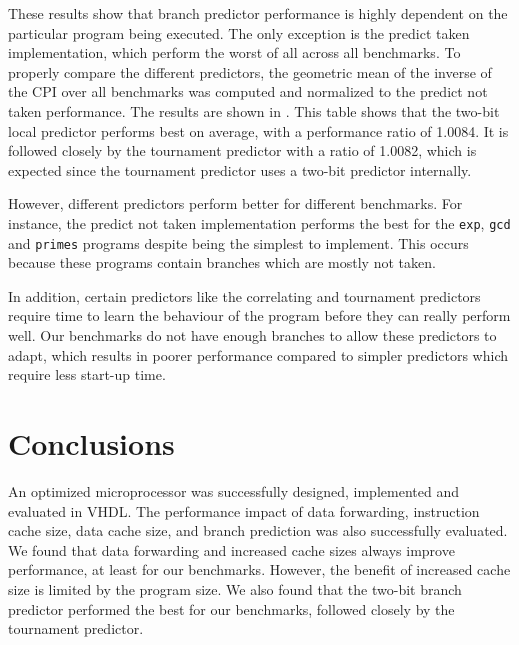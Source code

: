 \documentclass[conference,hidelinks]{IEEEtran}
\begin{document}
These results show that branch predictor performance is highly dependent on the particular program being executed. The only exception is the predict taken implementation, which perform the worst of all across all benchmarks. To properly compare the different predictors, the geometric mean of the inverse of the CPI over all benchmarks was computed and normalized to the predict not taken performance. The results \newpage \noindent are shown in . This table shows that the two-bit local predictor performs best on average, with a performance ratio of 1.0084. It is followed closely by the tournament predictor with a ratio of 1.0082, which is expected since the tournament predictor uses a two-bit predictor internally.

\begin{table}[!htb]
\small
\centering
\caption{Relative performance of different branch predictors.}
\label{tab:bp_performance}
\end{table}

However, different predictors perform better for different benchmarks. For instance, the predict not taken implementation performs the best for the \texttt{exp}, \texttt{gcd} and \texttt{primes} programs despite being the simplest to implement. This occurs because these programs contain branches which are mostly not taken.

In addition, certain predictors like the correlating and tournament predictors require time to learn the behaviour of the program before they can really perform well. Our benchmarks do not have enough branches to allow these predictors to adapt, which results in poorer performance compared to simpler predictors which require less start-up time.

\section{Conclusions}

An optimized microprocessor was successfully designed, implemented and evaluated in VHDL. The performance impact of data forwarding, instruction cache size, data cache size, and branch prediction was also successfully evaluated. We found that data forwarding and increased cache sizes always improve performance, at least for our benchmarks. However, the benefit of increased cache size is limited by the program size. We also found that the two-bit branch predictor performed the best for our benchmarks, followed closely by the tournament predictor.
\end{document}
